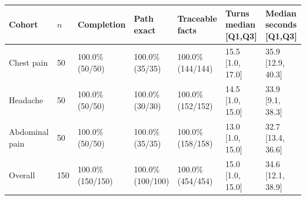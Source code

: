\begin{tabular}{lllllll}
\hline
Cohort & $n$ & Completion & Path exact & \shortstack{Traceable\\facts} & \shortstack{Turns\\median [Q1,Q3]} & \shortstack{Median seconds\\{}[Q1,Q3]} \\
\hline
Chest pain & 50 & \shortstack{100.0\%\\(50/50)} & \shortstack{100.0\%\\(35/35)} & \shortstack{100.0\%\\(144/144)} & 15.5 [1.0, 17.0] & 35.9 [12.9, 40.3] \\
Headache & 50 & \shortstack{100.0\%\\(50/50)} & \shortstack{100.0\%\\(30/30)} & \shortstack{100.0\%\\(152/152)} & 14.5 [1.0, 15.0] & 33.9 [9.1, 38.3] \\
Abdominal pain & 50 & \shortstack{100.0\%\\(50/50)} & \shortstack{100.0\%\\(35/35)} & \shortstack{100.0\%\\(158/158)} & 13.0 [1.0, 15.0] & 32.7 [13.4, 36.6] \\
Overall & 150 & \shortstack{100.0\%\\(150/150)} & \shortstack{100.0\%\\(100/100)} & \shortstack{100.0\%\\(454/454)} & 15.0 [1.0, 15.0] & 34.6 [12.1, 38.9] \\
\hline
\end{tabular}
